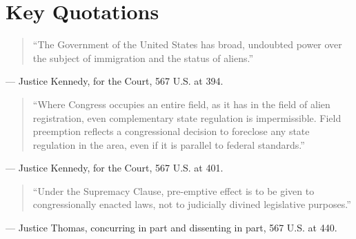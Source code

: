 \documentclass[12pt]{article}
\begin{document}
\section{Key Quotations}

\begin{quote}
``The Government of the United States has broad, undoubted power over the subject of immigration and the status of aliens.''
\end{quote}
\noindent --- Justice Kennedy, for the Court, 567 U.S. at 394.

\begin{quote}
``Where Congress occupies an entire field, as it has in the field of alien registration, even complementary state regulation is impermissible. Field preemption reflects a congressional decision to foreclose any state regulation in the area, even if it is parallel to federal standards.''
\end{quote}
\noindent --- Justice Kennedy, for the Court, 567 U.S. at 401.

\begin{quote}
``Under the Supremacy Clause, pre-emptive effect is to be given to congressionally enacted laws, not to judicially divined legislative purposes.''
\end{quote}
\noindent --- Justice Thomas, concurring in part and dissenting in part, 567 U.S. at 440.
\end{document}
